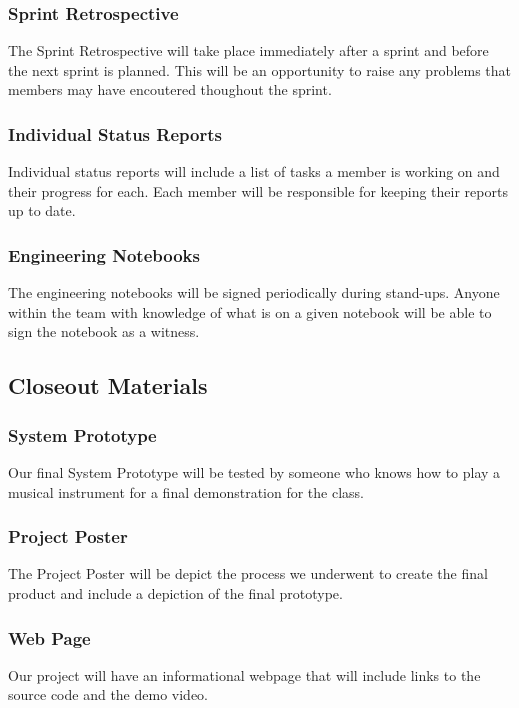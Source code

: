 \subsubsection{Sprint Retrospective}
The Sprint Retrospective will take place immediately after a sprint and before the next sprint is planned. This will be an opportunity to raise any problems that members may have encoutered thoughout the sprint.

\subsubsection{Individual Status Reports}
Individual status reports will include a list of tasks a member is working on and their progress for each. Each member will be responsible for keeping their reports up to date.

\subsubsection{Engineering Notebooks}
The engineering notebooks will be signed periodically during stand-ups. Anyone within the team with knowledge of what is on a given notebook will be able to sign the notebook as a witness.

\subsection{Closeout Materials}

\subsubsection{System Prototype}
Our final System Prototype will be tested by someone who knows how to play a musical instrument for a final demonstration for the class.

\subsubsection{Project Poster}
The Project Poster will be depict the process we underwent to create the final product and include a depiction of the final prototype.

\subsubsection{Web Page}
Our project will have an informational webpage that will include links to the source code and the demo video.

